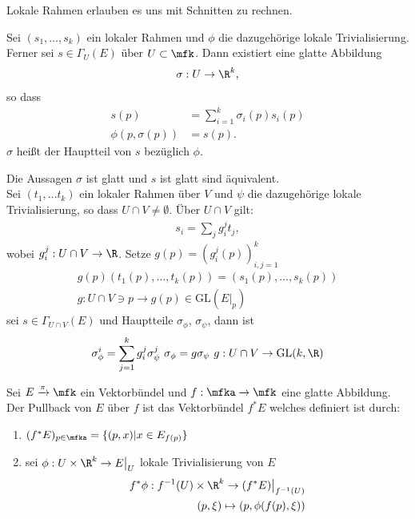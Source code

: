 Lokale Rahmen erlauben es uns mit Schnitten zu rechnen.

\begin{defs}[Hauptteil]
Sei $(s_1, \dots, s_k)$ ein lokaler Rahmen und $\phi$ die dazugehörige lokale Trivialisierung.
Ferner sei $s \in \Gamma_U (E)$ über $U \subset \mfk$.
Dann existiert eine glatte Abbildung
\begin{align}
\sigma : U \to \R^k,
\end{align}
so dass
\begin{align}
s(p) &= \sum^{k}_{i=1} \sigma_i (p) s_i(p)\\
\phi(p, \sigma(p)) &= s(p).
\end{align}
$\sigma$ heißt der Hauptteil von $s$ bezüglich $\phi$.
\end{defs}

\begin{bem}
Die Aussagen $\sigma$ ist glatt und $s$ ist glatt sind äquivalent.\\
Sei $(t_1, \dots t_k)$ ein lokaler Rahmen über $V$ und $\psi$ die dazugehörige lokale Trivialisierung, so dass $U \cap V \neq \emptyset$.
Über $U \cap V$ gilt:
\begin{align}
s_i = \sum_j g^j_i t_j,
\end{align}
wobei $g^j_i : U \cap V \to \R$.
Setze $g(p) = (g^j_i (p))^k_{i,j =1}$
\begin{align}
g(p)(t_1(p), \dots , t_k(p)) = (s_1(p), \dots, s_k(p))\\
g: U \cap V \ni p \to g(p) \in \mathrm{GL}(E\big\vert_p)
\end{align}
sei $s \in \Gamma_{U \cap V} (E)$ und Hauptteile $\sigma_\phi$, $\sigma_\psi$, dann ist
\begin{align}
\sigma^i_\phi = \sum^k_{j=1} g^j_i \sigma^j_{\psi}\
\sigma_\phi = g \sigma_\psi\
g : U \cap V \to \mathrm{GL} (k, \R)
\end{align}
\end{bem}


\begin{defs}[Pullback]
Sei $E	\xrightarrow{\pi} \mfk$ ein Vektorbündel und $f : \mfka \to \mfk$ eine glatte Abbildung.
Der Pullback von $E$ über $f$ ist das Vektorbündel $f^* E$ welches definiert ist durch:
\begin{enumerate}
\item $(f^* E)_{p \in \mfka} = \{ (p, x) \vert x \in E_{f(p)}\}$
\item sei $\phi : U \times \R^k \to E\big\vert_U$ lokale Trivialisierung von $E$
\begin{align}
f^* \phi : f^{-1} (U) \times \R^k \to (f^* E)\big\vert_{f^{-1}(U)}\\
(p, \xi) \mapsto (p, \phi(f(p), \xi)) 
\end{align}
\end{enumerate}
\end{defs}


